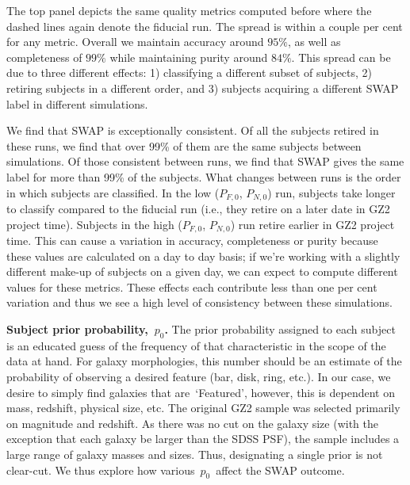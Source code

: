 \documentclass[twocolumn]{aastex6}
\newcommand{\Pf}{$P_{F,0}$}
\newcommand{\Pn}{$P_{N,0}$}
\newcommand{\p}{$p_0$}
\newcommand{\feat}{`Featured'}
\begin{document}
The top panel depicts the same quality metrics computed before where the dashed 
lines again denote the fiducial run.  The spread is within a couple per cent for any
metric. Overall we maintain accuracy around $95\%$, as well as completeness of $99\%$
while maintaining purity around $84\%$. This spread can be due to three different
effects: 1) classifying a different subset of subjects, 2) retiring subjects in a different
order, and 3) subjects acquiring a different SWAP label in different simulations. 

We find that SWAP is exceptionally consistent. Of all the subjects retired in
these runs, we find that over 99\% of them are the same subjects between simulations.
Of those consistent between runs, we find that SWAP gives the same label for 
more than 99\% of the subjects. What changes between runs is the order in 
which subjects are classified. In the low (\Pf, \Pn) run, subjects take longer to classify 
compared to the fiducial run (i.e., they retire on a later date in GZ2 project time). 
Subjects in the high (\Pf, \Pn) run retire earlier in GZ2 project time. This can cause
a variation in accuracy, completeness or purity because these values are 
calculated on a day to day basis; if we're working with a slightly different make-up
of subjects on a given day, we can expect to compute different values for these metrics.
These effects each contribute less than one per cent variation and thus we see a 
high level of consistency between these simulations. 



\begin{figure}[t!]

\end{figure}


\textbf{Subject prior probability,~\p.}
The prior probability assigned to each subject is an educated guess of 
the frequency of that characteristic in the scope of the data at hand. 
For galaxy morphologies, this number should be an estimate of the probability
of observing a desired feature (bar, disk, ring, etc.). In our case, 
we desire to simply find galaxies that are~\feat, however, this is dependent 
on mass, redshift, physical size, etc. The original GZ2 sample was selected
primarily on magnitude and redshift.  As there was no cut on the galaxy size
(with the exception that each galaxy be larger than the SDSS PSF), the sample
includes a large range of galaxy masses and sizes. Thus, designating a single 
prior is not clear-cut. We thus explore how various~\p~affect the SWAP outcome.
\end{document}
